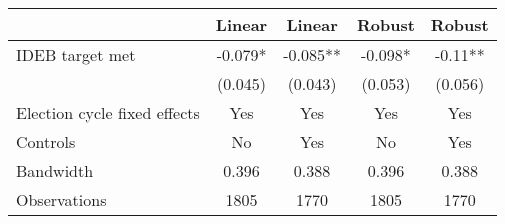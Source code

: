 \begin{tabular}{lcccc}
  \toprule
 & Linear & Linear & Robust & Robust \\ 
  \midrule
IDEB target met & -0.079* & -0.085** & -0.098* & -0.11** \\ 
   & (0.045) & (0.043) & (0.053) & (0.056) \\ 
  Election cycle fixed effects & Yes & Yes & Yes & Yes \\ 
  Controls & No & Yes & No & Yes \\ 
  Bandwidth & 0.396 & 0.388 & 0.396 & 0.388 \\ 
  Observations & 1805 & 1770 & 1805 & 1770 \\ 
   \bottomrule
\end{tabular}
